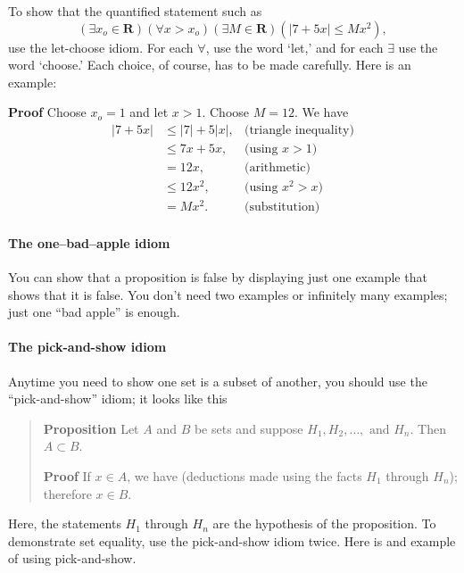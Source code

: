 \documentclass[12pt,fleqn]{article}
\newcommand{\reals}{\mathbf{R}}
\newcounter{ex}\setcounter{ex}{0}
\newcounter{id}\setcounter{id}{0}
\newcounter{se}\setcounter{se}{0}
\begin{document}
To show that the quantified statement such as
\begin{equation*}
  \left(\exists x_o \in \reals \right) \left(\forall x > x_o\right) 
\left(\exists M \in \reals \right)  \left(|7 + 5 x| \leq M x^2\right),
\end{equation*}
use the let-choose idiom. For each \(\forall\), use the word `let,' and for each \(\exists\) use the word `choose.' 
Each choice, of course, has to be made carefully. Here is an example:

\noindent \textbf{Proof} Choose \(x_o = 1\) and let \(x > 1\). Choose \(M = 12\).  We have
\begin{align*}
  |7 + 5 x| &\leq |7| + 5 |x|, &\mbox{(triangle inequality)} \\
            &\leq 7 x + 5 x,   &\mbox{(using } x > 1) \\
            &= 12 x,        &\mbox{(arithmetic)} \\
            &\leq 12 x^2,   &\mbox{(using } x^2 > x) \\
            &= M x^2.       &\mbox{(substitution)} 
\end{align*}



\paragraph{The one--bad--apple idiom}

You can show that a proposition is false by displaying just
one example that shows that it is false. You don't need two examples
or infinitely many examples; just one ``bad apple'' is enough.  





\paragraph{The pick-and-show idiom}

Anytime you need to show one set is a subset of another, you should use the
``pick-and-show'' idiom; it looks like this

\begin{quote}

\textbf{Proposition} Let \(A\) and \(B\) be sets and suppose \(H_1, H_2 , \dots
,\mbox{ and } H_n\). Then  \(A \subset B\).

\vspace{0.1in}

\textbf{Proof} If \(x \in A\), we have (deductions made using the 
facts \(H_1\) through \(H_n\)); therefore \(x \in B\).

\end{quote}
Here, the statements \(H_1\) through \(H_n\) are the hypothesis of the
proposition. To demonstrate set equality, use the pick-and-show idiom twice. Here
is and example of using pick-and-show.
\end{document}
